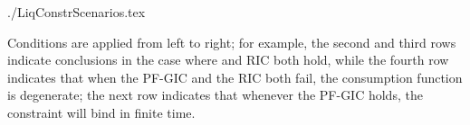 \documentclass[titlepage,abstract]{bejournal}
\begin{document}
\begin{verbatimwrite}{./LiqConstrScenarios.tex}
\begin{table}[b]
\begin{center}
\settowidth\LiqConstrScenariosWidth{\usebox{\LiqConstrScenarios}}
\usebox{\LiqConstrScenarios}
\parbox{\LiqConstrScenariosWidth}{\footnotesize Conditions are applied from left to right; for example, the second and third rows indicate conclusions in the case where  and RIC both hold, while the fourth row indicates that when the PF-GIC and the RIC both fail, the consumption function is degenerate; the next row indicates that whenever the PF-GIC holds, the constraint will bind in finite time.}

\medskip
\end{center}
\end{table}


\end{verbatimwrite}


\end{document}

